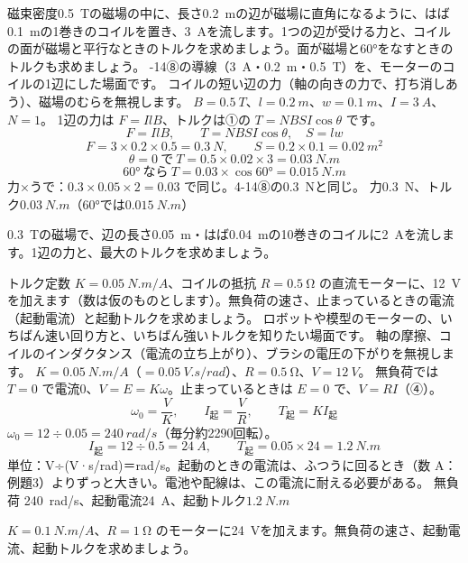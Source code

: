 
\label{ph:電-12:ex1}
\begin{phreidai}[磁場の中のコイルのトルク]
磁束密度\qty{0.5}{T}の磁場の中に、長さ\qty{0.2}{m}の辺が磁場に直角になるように、はば\qty{0.1}{m}の1巻きのコイルを置き、\qty{3}{A}を流します。1つの辺が受ける力と、コイルの面が磁場と平行なときのトルクを求めましょう。面が磁場と60°をなすときのトルクも求めましょう。
-14⑧の導線（\qty{3}{A}・\qty{0.2}{m}・\qty{0.5}{T}）を、モーターのコイルの1辺にした場面です。
\phmushi
コイルの短い辺の力（軸の向きの力で、打ち消しあう）、磁場のむらを無視します。
\phzu
$B=\qty{0.5}{T}$、$l=\qty{0.2}{m}$、$w=\qty{0.1}{m}$、$I=\qty{3}{A}$、$N=1$。
\phriyu
1辺の力は $F=IlB$、トルクは①の $T=NBSI\cos\theta$ です。
\phtateru
\[F=IlB,\qquad T=NBSI\cos\theta,\quad S=lw\]
\phtoku
\[F=3\times0.2\times0.5=\qty{0.3}{N},\qquad S=0.2\times0.1=\qty{0.02}{m^2}\]
\[\theta=0\ \text{で}\ T=0.5\times0.02\times3=\qty{0.03}{N.m}\]
\[60°\ \text{なら}\ T=0.03\times\cos60°=\qty{0.015}{N.m}\]
\phtashikame
力×うで：$0.3\times0.05\times2=0.03$ で同じ。4-14⑧の\qty{0.3}{N}と同じ。
\kotae 力\qty{0.3}{N}、トルク$\qty{0.03}{N.m}$（60°では$\qty{0.015}{N.m}$）
\end{phreidai}
\begin{jibun}
\qty{0.3}{T}の磁場で、辺の長さ\qty{0.05}{m}・はば\qty{0.04}{m}の10巻きのコイルに\qty{2}{A}を流します。1辺の力と、最大のトルクを求めましょう。
\end{jibun}

\label{ph:電-12:ex2}
\begin{phreidai}[直流モーターの無負荷の速さと起動トルク]
トルク定数 $K=\qty{0.05}{N.m/A}$、コイルの抵抗 $R=\qty{0.5}{\ohm}$ の直流モーターに、\qty{12}{V}を加えます（数は仮のものとします）。無負荷の速さ、止まっているときの電流（起動電流）と起動トルクを求めましょう。
\phbamen
ロボットや模型のモーターの、いちばん速い回り方と、いちばん強いトルクを知りたい場面です。
\phmushi
軸の摩擦、コイルのインダクタンス（電流の立ち上がり）、ブラシの電圧の下がりを無視します。
\phzu
$K=\qty{0.05}{N.m/A}$（$=\qty{0.05}{V.s/rad}$）、$R=\qty{0.5}{\ohm}$、$V=\qty{12}{V}$。
\phriyu
無負荷では $T=0$ で電流0、$V=E=K\omega$。止まっているときは $E=0$ で、$V=RI$（④）。
\phtateru
\[\omega_0=\frac{V}{K},\qquad I_{\text{起}}=\frac{V}{R},\qquad T_{\text{起}}=KI_{\text{起}}\]
\phtoku
$\omega_0=12\div0.05=\qty{240}{rad/s}$（毎分約2290回転）。
\[I_{\text{起}}=12\div0.5=\qty{24}{A},\qquad T_{\text{起}}=0.05\times24=\qty{1.2}{N.m}\]
\phtashikame
単位：V÷(V·s/rad)＝rad/s。起動のときの電流は、ふつうに回るとき（数 A：例題3）よりずっと大きい。電池や配線は、この電流に耐える必要がある。
\kotae 無負荷 \qty{240}{rad/s}、起動電流\qty{24}{A}、起動トルク$\qty{1.2}{N.m}$
\end{phreidai}
\begin{jibun}
$K=\qty{0.1}{N.m/A}$、$R=\qty{1}{\ohm}$ のモーターに\qty{24}{V}を加えます。無負荷の速さ、起動電流、起動トルクを求めましょう。
\end{jibun}

